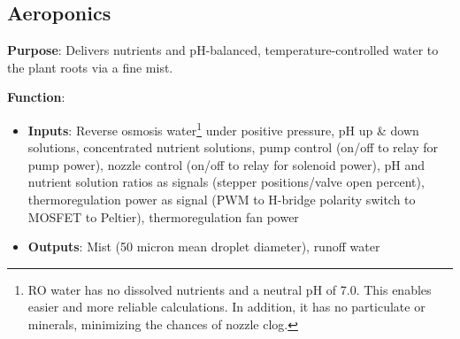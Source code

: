 \documentclass{report}
\begin{document}
\vspace{1cm}

\subsection{Aeroponics}
\label{sec:aeroponics}

\textbf{Purpose}: Delivers nutrients and pH-balanced, temperature-controlled water to the plant roots via a fine mist.

\textbf{Function}:
\begin{itemize}
    \item \textbf{Inputs}: Reverse osmosis water\footnote{RO water has no dissolved nutrients and a neutral pH of 7.0. This enables easier and more reliable calculations. In addition, it has no particulate or minerals, minimizing the chances of nozzle clog.} under positive pressure, pH up \& down solutions, concentrated nutrient solutions, pump control (on/off to relay for pump power), nozzle control (on/off to relay for solenoid power), pH and nutrient solution ratios as signals (stepper positions/valve open percent), thermoregulation power as signal (PWM to H-bridge polarity switch to MOSFET to Peltier), thermoregulation fan power
    \item \textbf{Outputs}: Mist (50 micron mean droplet diameter), runoff water
\end{itemize}
\end{document}
